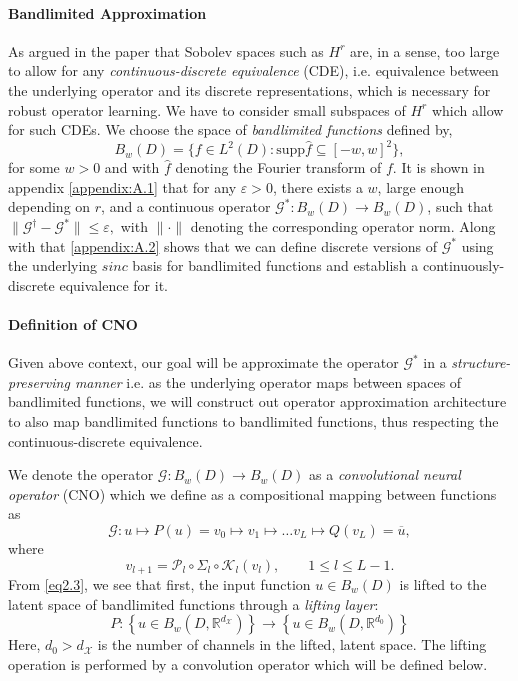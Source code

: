 \documentclass[reqno,10pt]{amsart}
\theoremstyle{plain}
\theoremstyle{definition}
\newcommand{\bb}[1]{\mathbb{#1}}
\newcommand{\cal}[1]{\mathcal{#1}}
\begin{document}
    \paragraph{\bf Bandlimited Approximation} As argued in the paper \cite{FB2023} that Sobolev spaces such as $H^r$ are, in a sense, too large to allow for any {\it continuous-discrete equivalence} (CDE), i.e. equivalence between the underlying operator and its discrete representations, which is necessary for robust operator learning. We have to consider small subspaces of $H^r$ which allow for such CDEs. We choose the space of {\it bandlimited functions} defined by,
    \begin{equation}
        B_w(D) = \{f \in L^2(D) : \text{supp}\hat{f} \subseteq [-w,w]^2\},
    \end{equation}
    for some $w > 0$ and with $\hat{f}$ denoting the Fourier transform of $f$. It is shown in appendix \ref{appendix:A.1} that for any $\varepsilon > 0$, there exists a $w$, large enough depending on $r$, and a continuous operator $\cal G^* : B_w(D) \to B_w(D)$, such that $\|\cal G^\dag - \cal G^*\| \leq \varepsilon,$ with $\|\cdot\|$ denoting the corresponding operator norm. Along with that \ref{appendix:A.2} shows that we can define discrete versions of $\cal G^*$ using the underlying $sinc$ basis for bandlimited functions and establish a continuously-discrete equivalence for it.

    \paragraph{\bf Definition of CNO} \label{def:CNO} Given above context, our goal will be approximate the operator $\cal G^*$ in a {\it structure-preserving manner} i.e. as the underlying operator maps between spaces of bandlimited functions, we will construct out operator approximation architecture to also map bandlimited functions to bandlimited functions, thus respecting the continuous-discrete equivalence.

    \noindent We denote the operator $\cal G : B_w(D) \to B_w(D)$ as a {\it convolutional neural operator} (CNO) which we define as a compositional mapping between functions as
    \begin{equation}\label{eq2.3}
        \cal G : u \mapsto P(u) = v_0 \mapsto v_1 \mapsto \dots v_L \mapsto Q(v_L) = \overline{u},
    \end{equation}
    where
    \begin{equation}
        v_{l+1} = \cal P_l \circ \Sigma_l \circ \cal K_l(v_l), \qquad 1 \leq l \leq L - 1.
    \end{equation}
    From \ref{eq2.3}, we see that first, the input function $u \in B_w(D)$ is lifted to the latent space of bandlimited functions through a {\it lifting layer}: 
    $$ P : \left\{u \in B_w(D,\bb R^{d_{\cal X}}) \right\} \to \left\{u \in B_w(D,\bb R^{d_0}) \right\}$$ 
    Here, $d_0 > d_{\cal X}$ is the number of channels in the lifted, latent space. The lifting operation is performed by a convolution operator which will be defined below.
\end{document}
